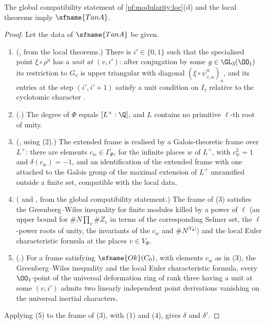 \begin{theorem}\label{pf:modularity:tanA}
The global compatibility statement of \cref{pf:modularity:loc}(d) and the local theorems imply $\sfname{TanA}$.
\end{theorem}

\begin{proof}
Let the data of $\sfname{TanA}$ be given.
\begin{enumerate}[label=(\arabic*)]
\item (, from the local theorems.) There is $i'\in\{0,1\}$ such that the specialised
point $\xi\circ\rho^{\mathrm u}$ has a \emph{unit at $(v,i')$}: after conjugation by some $g\in\GL_3(\OO_1)$ its restriction
to $G_v$ is upper triangular with diagonal $(\xi\circ\psi^{\mathrm u}_{v,a})_a$, and its entries at the step $(i',i'+1)$
satisfy a unit condition on $I_v$ relative to the cyclotomic character \cite{LeanSource2026}.
\item (.) The degree of $\Phi$ equals $[L^+:\Q]$, and $L$ contains no primitive $\ell$-th
root of unity.
\item (, using (2).) The extended frame is realised by a Galois-theoretic frame over
$L^+$: there are elements $c_w\in\Gamma_\Phi$, for the infinite places $w$ of $L^+$, with $c_w^2=1$ and $\delta(c_w)=-1$,
and an identification of the extended frame with one attached to the Galois group of the maximal extension of $L^+$
unramified outside a finite set, compatible with the local data.
\item ( and , from the global compatibility statement.) The
frame of (3) satisfies the Greenberg--Wiles inequality for finite modules killed by a power of $\ell$ (an upper bound for
$\#N\prod_v\#Z_v$ in terms of the corresponding Selmer set, the $\ell$-power roots of unity, the invariants of the $c_w$ and
$\#N^{|V_\Phi|}$) and the local Euler characteristic formula at the places $v\in V_\Phi$.
\item (.) For a frame satisfying $\sfname{Ok}(C_0)$, with elements $c_w$ as in (3), the
Greenberg--Wiles inequality and the local Euler characteristic formula, every $\OO_1$-point of the universal deformation ring
of rank three having a unit at some $(v,i')$ admits two linearly independent point derivations vanishing on the universal
inertial characters.
\end{enumerate}
Applying (5) to the frame of (3), with (1) and (4), gives $\delta$ and $\delta'$.
\end{proof}

